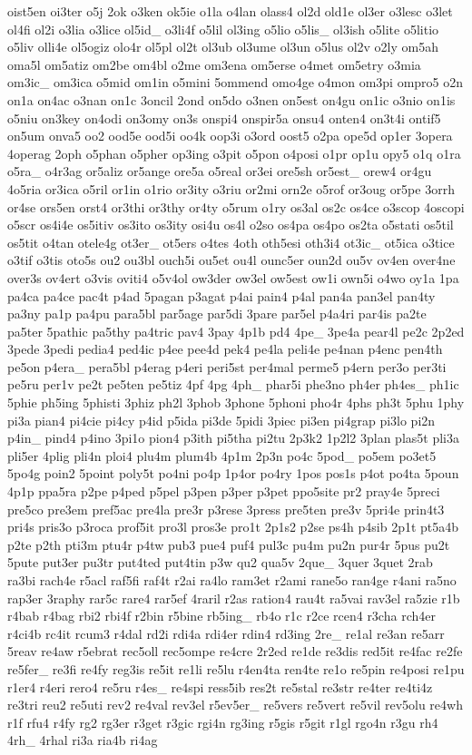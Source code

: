 {oist5en oi3ter o5j 2ok o3ken ok5ie o1la o4lan olass4 ol2d old1e ol3er o3lesc o3let ol4fi ol2i o3lia o3lice ol5id\-\_\- o3li4f o5lil ol3ing o5lio o5lis\-\_\- ol3ish o5lite o5litio o5liv olli4e ol5ogiz olo4r ol5pl ol2t ol3ub ol3ume ol3un o5lus ol2v o2ly om5ah oma5l om5atiz om2be om4bl o2me om3ena om5erse o4met om5etry o3mia om3ic\-\_\- om3ica o5mid om1in o5mini 5ommend omo4ge o4mon om3pi ompro5 o2n on1a on4ac o3nan on1c 3oncil 2ond on5do o3nen on5est on4gu on1ic o3nio on1is o5niu on3key on4odi on3omy on3s onspi4 onspir5a onsu4 onten4 on3t4i ontif5 on5um onva5 oo2 ood5e ood5i oo4k oop3i o3ord oost5 o2pa ope5d op1er 3opera 4operag 2oph o5phan o5pher op3ing o3pit o5pon o4posi o1pr op1u opy5 o1q o1ra o5ra\-\_\- o4r3ag or5aliz or5ange ore5a o5real or3ei ore5sh or5est\-\_\- orew4 or4gu 4o5ria or3ica o5ril or1in o1rio or3ity o3riu or2mi orn2e o5rof or3oug or5pe 3orrh or4se ors5en orst4 or3thi or3thy or4ty o5rum o1ry os3al os2c os4ce o3scop 4oscopi o5scr os4i4e os5itiv os3ito os3ity osi4u os4l o2so os4pa os4po os2ta o5stati os5til os5tit o4tan otele4g ot3er\-\_\- ot5ers o4tes 4oth oth5esi oth3i4 ot3ic\-\_\- ot5ica o3tice o3tif o3tis oto5s ou2 ou3bl ouch5i ou5et ou4l ounc5er oun2d ou5v ov4en over4ne over3s ov4ert o3vis oviti4 o5v4ol ow3der ow3el ow5est ow1i own5i o4wo oy1a 1pa pa4ca pa4ce pac4t p4ad 5pagan p3agat p4ai pain4 p4al pan4a pan3el pan4ty pa3ny pa1p pa4pu para5bl par5age par5di 3pare par5el p4a4ri par4is pa2te pa5ter 5pathic pa5thy pa4tric pav4 3pay 4p1b pd4 4pe\-\_\- 3pe4a pear4l pe2c 2p2ed 3pede 3pedi pedia4 ped4ic p4ee pee4d pek4 pe4la peli4e pe4nan p4enc pen4th pe5on p4era\-\_\- pera5bl p4erag p4eri peri5st per4mal perme5 p4ern per3o per3ti pe5ru per1v pe2t pe5ten pe5tiz 4pf 4pg 4ph\-\_\- phar5i phe3no ph4er ph4es\-\_\- ph1ic 5phie ph5ing 5phisti 3phiz ph2l 3phob 3phone 5phoni pho4r 4phs ph3t 5phu 1phy pi3a pian4 pi4cie pi4cy p4id p5ida pi3de 5pidi 3piec pi3en pi4grap pi3lo pi2n p4in\-\_\- pind4 p4ino 3pi1o pion4 p3ith pi5tha pi2tu 2p3k2 1p2l2 3plan plas5t pli3a pli5er 4plig pli4n ploi4 plu4m plum4b 4p1m 2p3n po4c 5pod\-\_\- po5em po3et5 5po4g poin2 5point poly5t po4ni po4p 1p4or po4ry 1pos pos1s p4ot po4ta 5poun 4p1p ppa5ra p2pe p4ped p5pel p3pen p3per p3pet ppo5site pr2 pray4e 5preci pre5co pre3em pref5ac pre4la pre3r p3rese 3press pre5ten pre3v 5pri4e prin4t3 pri4s pris3o p3roca prof5it pro3l pros3e pro1t 2p1s2 p2se ps4h p4sib 2p1t pt5a4b p2te p2th pti3m ptu4r p4tw pub3 pue4 puf4 pul3c pu4m pu2n pur4r 5pus pu2t 5pute put3er pu3tr put4ted put4tin p3w qu2 qua5v 2que\-\_\- 3quer 3quet 2rab ra3bi rach4e r5acl raf5fi raf4t r2ai ra4lo ram3et r2ami rane5o ran4ge r4ani ra5no rap3er 3raphy rar5c rare4 rar5ef 4raril r2as ration4 rau4t ra5vai rav3el ra5zie r1b r4bab r4bag rbi2 rbi4f r2bin r5bine rb5ing\-\_\- rb4o r1c r2ce rcen4 r3cha rch4er r4ci4b rc4it rcum3 r4dal rd2i rdi4a rdi4er rdin4 rd3ing 2re\-\_\- re1al re3an re5arr 5reav re4aw r5ebrat rec5oll rec5ompe re4cre 2r2ed re1de re3dis red5it re4fac re2fe re5fer\-\_\- re3fi re4fy reg3is re5it re1li re5lu r4en4ta ren4te re1o re5pin re4posi re1pu r1er4 r4eri rero4 re5ru r4es\-\_\- re4spi ress5ib res2t re5stal re3str re4ter re4ti4z re3tri reu2 re5uti rev2 re4val rev3el r5ev5er\-\_\- re5vers re5vert re5vil rev5olu re4wh r1f rfu4 r4fy rg2 rg3er r3get r3gic rgi4n rg3ing r5gis r5git r1gl rgo4n r3gu rh4 4rh\-\_\- 4rhal ri3a ria4b ri4ag }
